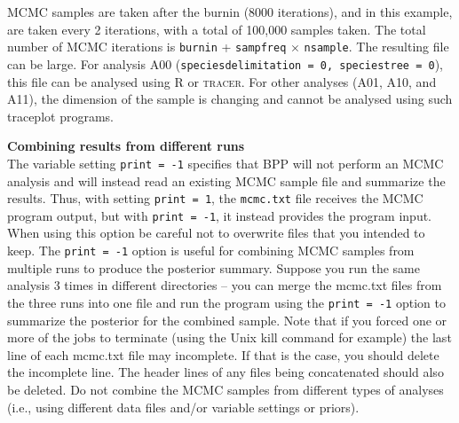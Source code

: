 \documentclass{book}
\numberwithin{equation}{section} \renewcommand{\baselinestretch}{0.55}
\begin{document}
MCMC samples are taken after the burnin (8000 iterations), and in this
example, are taken every 2 iterations, with a total of 100,000 samples
taken.  The total number of MCMC iterations is \texttt{burnin} +
\texttt{sampfreq} $\times$ \texttt{nsample}.  The resulting file can
be large.  For analysis A00 (\texttt{speciesdelimitation = 0,
  speciestree = 0}), this file can be analysed using R or
\textsc{tracer}.  For other analyses (A01, A10, and A11), the
dimension of the sample is changing and cannot be analysed using such
traceplot programs.

\newpage
\begin{mdframed}
  \textbf{Combining results from different runs} \\
  The variable setting \texttt{print = -1} specifies that \textsc{BPP}
  will not perform an MCMC analysis and will instead read an existing
  MCMC sample file and summarize the results.  Thus, with setting
  \texttt{print = 1}, the \texttt{mcmc.txt} file receives the MCMC
  program output, but with \texttt{print = -1}, it instead provides
  the program input.  When using this option be careful not to
  overwrite files that you intended to keep.  The \texttt{print = -1}
  option is useful for combining MCMC samples from multiple runs to
  produce the posterior summary.  Suppose you run the same analysis 3
  times in different directories -- you can merge the mcmc.txt files
  from the three runs into one file and run the program using the
  \texttt{print = -1} option to summarize the posterior for the
  combined sample. Note that if you forced one or more of the jobs to
  terminate (using the Unix kill command for example) the last line of
  each mcmc.txt file may incomplete. If that is the case, you should
  delete the incomplete line. The header lines of any files being
  concatenated should also be deleted.  Do not combine the MCMC
  samples from different types of analyses (i.e., using different data
  files and/or variable settings or priors).
\end{mdframed}
\end{document}
